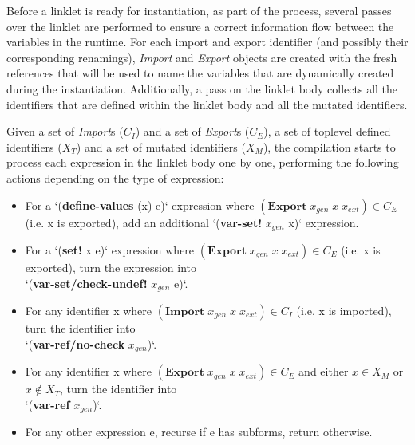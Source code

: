 		\begin{paragraph-here}
			Before a linklet is ready for instantiation, as part of the
			 process, several passes over the linklet are
			performed to ensure a correct information flow between the variables
			in the run\dash time. For each import and export identifier (and
			possibly their corresponding renamings), \emph{Import} and
			\emph{Export} objects are created with the fresh references that
			will be used to name the variables that are dynamically created during
			the instantiation. Additionally, a pass on the linklet body collects
			all the identifiers that are defined within the linklet body and all
			the mutated identifiers.
		\end{paragraph-here}



		\begin{paragraph-here}
			Given a set of \emph{Import}s ($\mathit{C_I}$) and a set of
			\emph{Export}s ($\mathit{C_E}$), a set of toplevel defined
			identifiers ($\mathit{X_T}$) and a set of mutated identifiers
			($\mathit{X_M}$), the compilation starts to process each expression in
			the linklet body one by one, performing the following actions
			depending on the type of expression:

		\end{paragraph-here}

		\begin{itemize}
		\small
		\item For a `(\textbf{define-values} (x) e)` expression where $(\textbf{Export}\; x_{gen}\; x\; x_{ext}) \in \mathit{C_E}$ (i.e. x is exported), add an additional `(\textbf{var-set!} $x_{gen}$ x)` expression.
		\item For a `(\textbf{set!} x e)` expression where $(\textbf{Export}\; x_{gen}\; x\; x_{ext}) \in \mathit{C_E}$ (i.e. x is exported), turn the expression into \\ `(\textbf{var-set/check-undef!} $x_{gen}$ e)`.
		\item For any identifier x where $(\textbf{Import}\; x_{gen}\; x\; x_{ext}) \in \mathit{C_I}$  (i.e. x is imported), turn the identifier into \\ `(\textbf{var-ref/no-check} $x_{gen}$)`.
		\item For any identifier x where $(\textbf{Export}\; x_{gen}\; x\; x_{ext}) \in \mathit{C_E}$ and either $x \in \mathit{X_M}$ or $x \notin \mathit{X_T}$, turn the identifier into \\ `(\textbf{var-ref} $x_{gen}$)`.
		\item For any other expression e, recurse if e has subforms, return otherwise.
		\end{itemize}

